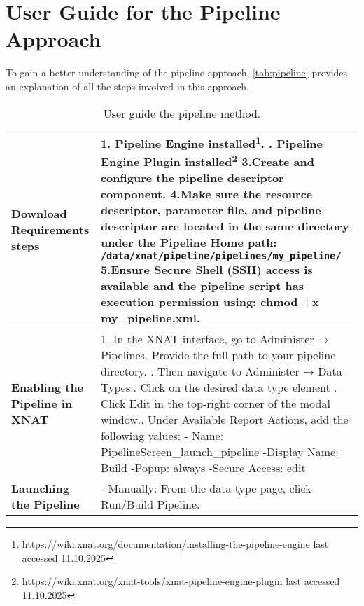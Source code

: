 \section{User Guide for the Pipeline Approach}
To gain a better understanding of the pipeline approach, \autoref{tab:pipeline} provides an explanation of all the steps involved in this approach.
\begin{table}[H]
  \centering
  \caption{ User guide the pipeline method.}
  \label{tab:pipeline}
  \begin{tabular}{|l|p{9cm}|}
  \hline
  \textbf{Download Requirements steps} & 
  1. Pipeline Engine installed\footnote{\url{https://wiki.xnat.org/documentation/installing-the-pipeline-engine} last accessed 11.10.2025}. \newline
  2. Pipeline Engine Plugin installed\footnote{\url{https://wiki.xnat.org/xnat-tools/xnat-pipeline-engine-plugin} last accessed 11.10.2025} \newline
  3.Create and configure the pipeline descriptor component. \newline
  4.Make sure the resource descriptor, parameter file, and pipeline descriptor are located in the same directory under the Pipeline Home path: \texttt{/data/xnat/pipeline/pipelines/my\_pipeline/} \newline
  5.Ensure Secure Shell (SSH) access is available and the pipeline script has execution permission using: chmod +x my\_pipeline.xml. 
   \\  \hline
  \textbf{Enabling the Pipeline in XNAT} & 
    1. In the XNAT interface, go to Administer → Pipelines. Provide the full path to your pipeline directory. \newline
    2. Then navigate to Administer → Data Types.\newline
    3. Click on the desired data type element \newline
    4. Click Edit in the top-right corner of the modal window.\newline
    5. Under Available Report Actions, add the following values:\newline
    - Name: PipelineScreen\_launch\_pipeline\newline
    -Display Name: Build\newline
    -Popup: always\newline
    -Secure Access: edit\newline
  \\ \hline
  \textbf{Launching the Pipeline} & 
   - Manually: From the data type page, click Run/Build Pipeline. \newline

\end{tabular}
\end{table}
